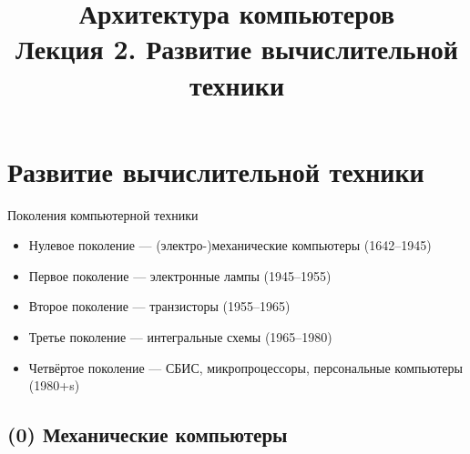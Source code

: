 \newcommand{\h}{handout,%
}



\title[Архитектура компьютеров. Лекция 2]{Архитектура компьютеров\texorpdfstring{\\}{ }Лекция 2. Развитие вычислительной техники}



\begin{frame}
\titlepage
\end{frame}

\section {Развитие вычислительной техники}

\begin{frame}{Поколения компьютерной техники}
\begin{itemize}
    \item Нулевое поколение — (электро-)механические компьютеры (1642–1945)
    \item Первое поколение — электронные лампы (1945–1955)
    \item Второе поколение — транзисторы (1955–1965)
    \item Третье поколение — интегральные схемы (1965–1980)
    \item Четвёртое поколение — СБИС, микропроцессоры, персональные компьютеры (1980+s)
\end{itemize}
\end{frame}

\subsection {(0) Механические компьютеры}

